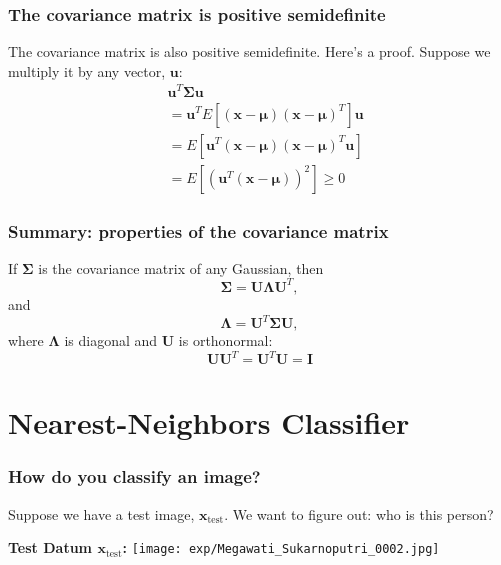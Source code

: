 \documentclass{beamer}
\begin{document}
\begin{frame}
  \frametitle{The covariance matrix is positive semidefinite}

  The covariance matrix is also positive semidefinite. Here's a
  proof. Suppose we multiply it by any vector, $\mathbf{u}$:
  \begin{align*}
    &\mathbf{u}^T\bm{\Sigma}\mathbf{u}\\
    &=\mathbf{u}^TE\left[(\mathbf{x}-\bm{\mu})(\mathbf{x}-\bm{\mu})^T\right]\mathbf{u}\\
    &=E\left[\mathbf{u}^T(\mathbf{x}-\bm{\mu})(\mathbf{x}-\bm{\mu})^T\mathbf{u}\right]\\
    &=E\left[\left(\mathbf{u}^T(\mathbf{x}-\bm{\mu})\right)^2\right]\ge 0
  \end{align*}
\end{frame}

\begin{frame}
  \frametitle{Summary: properties of the covariance matrix}

  If $\bm{\Sigma}$ is the covariance matrix of any Gaussian, then
  \[
  \bm{\Sigma}=\mathbf{U}\bm{\Lambda} \mathbf{U}^T,
  \]
  and
  \[
  \bm{\Lambda} = \mathbf{U}^T\bm{\Sigma}\mathbf{U},
  \]
  where $\bm{\Lambda}$ is diagonal and $\mathbf{U}$ is orthonormal:
  \[
  \mathbf{U}\mathbf{U}^T=\mathbf{U}^T\mathbf{U}=\mathbf{I}
  \]
\end{frame}

\section[NN]{Nearest-Neighbors Classifier}
\setcounter{subsection}{1}

\begin{frame}
  \frametitle{How do you classify an image?}

  Suppose we have a test image, $\mathbf{x}_{\mbox{test}}$.  We want to figure out:
  who is this person?

  \begin{centering}
    \begin{block}{\bf Test Datum $\mathbf{x}_{\mbox{test}}$:}
      \texttt{[image: exp/Megawati\_Sukarnoputri\_0002.jpg]}
    \end{block}
  \end{centering}
  
\end{frame}
    
\end{document}
